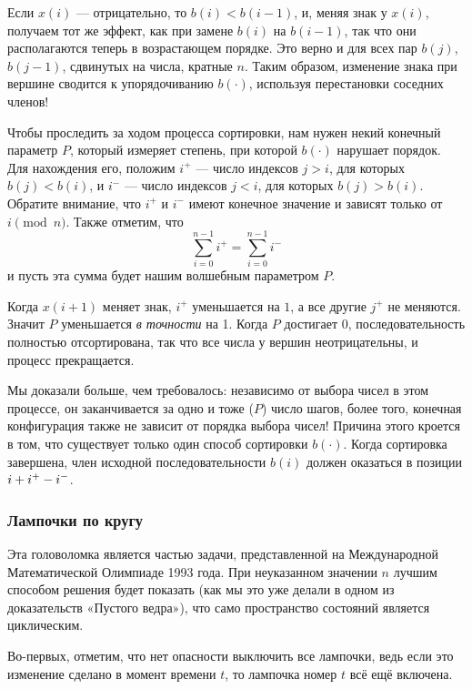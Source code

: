 Если $x(i)$ --- отрицательно, то $b(i) < b(i-1)$, и, меняя знак у $x(i)$, получаем тот же эффект, как при замене $b(i)$ на $b(i - 1)$, так что они располагаются теперь в возрастающем порядке.
Это верно и для всех пар $b(j)$, $b(j - 1)$, сдвинутых на числа, кратные $n$.
Таким образом, изменение знака при вершине сводится к упорядочиванию $b(\cdot)$, используя перестановки соседних членов!

Чтобы проследить за ходом процесса сортировки, нам нужен некий конечный параметр $P$, который измеряет степень, при которой $b(\cdot)$ нарушает порядок. %
Для нахождения его, положим $i^+$ --- число индексов $j > i$, для которых $b(j) < b(i)$, и $i^-$ --- число индексов $j < i$, для которых $b(j) > b(i)$.
Обратите внимание, что $i^+$ и $i^-$ имеют конечное значение и зависят только от $i \pmod n$.
Также отметим, что 
\[\sum_{i=0}^{n-1}i^+=\sum_{i=0}^{n-1}i^-\]
и пусть эта сумма будет нашим волшебным параметром $P$.

Когда $x(i+1)$ меняет знак, $i^+$ уменьшается на $1$, а все другие $j^+$ не меняются.
Значит $P$ уменьшается \emph{в точности} на 1.
Когда $P$ достигает $0$, последовательность полностью отсортирована, так что все числа у вершин неотрицательны, и процесс прекращается.

Мы доказали больше, чем требовалось:
независимо от выбора чисел в этом процессе, он заканчивается за одно и тоже ($P$) число шагов,
более того, конечная конфигурация также не зависит от порядка выбора чисел!
Причина этого кроется в том, что существует только один способ сортировки $b(\cdot)$.
Когда сортировка завершена, член исходной последовательности $b(i)$ должен оказаться в позиции $i \z+ i^+ - i^-$.
\heart

\subsubsection*{Лампочки по кругу}%

Эта головоломка является частью задачи, представленной на Международной Математической Олимпиаде 1993 года.
При неуказанном значении $n$ лучшим способом решения будет показать (как мы это уже делали в одном из доказательств «Пустого ведра»), что само пространство состояний является циклическим.

\medskip

Во-первых, отметим, что нет опасности выключить все лампочки,
ведь если это изменение сделано в момент времени $t$, то лампочка номер $t$ всё ещё включена.

